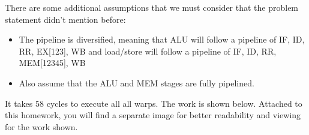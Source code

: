 \documentclass[11pt]{article}
\begin{document}
\begin{Answer}
	There are some additional assumptions that we must consider that the problem statement didn't mention before:
	\begin{itemize}
		\item The pipeline is diversified, meaning that ALU will follow a pipeline of IF, ID, RR, EX[123], WB and load/store will follow a pipeline of IF, ID, RR, MEM[12345], WB
		\item Also assume that the ALU and MEM stages are fully pipelined.
	\end{itemize}

	It takes 58 cycles to execute all all warps. The work is shown below. Attached to this homework, you will find a separate image for better readability and viewing for the work shown.


\end{Answer}
\end{document}
